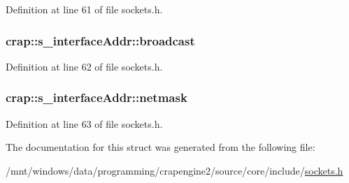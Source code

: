 Definition at line 61 of file sockets.\+h.

\hypertarget{structcrap_1_1s__interface_addr_a7071092e57a7629be2fc579d15ee8d0b}{}
\subsubsection[{broadcast}]{ crap\+::s\+\_\+interface\+Addr\+::broadcast}\label{structcrap_1_1s__interface_addr_a7071092e57a7629be2fc579d15ee8d0b}


Definition at line 62 of file sockets.\+h.

\hypertarget{structcrap_1_1s__interface_addr_a2854500a375e79a86faf2230ba6b9a93}{}
\subsubsection[{netmask}]{ crap\+::s\+\_\+interface\+Addr\+::netmask}\label{structcrap_1_1s__interface_addr_a2854500a375e79a86faf2230ba6b9a93}


Definition at line 63 of file sockets.\+h.



The documentation for this struct was generated from the following file\+:\begin{DoxyCompactItemize}
\item 
/mnt/windows/data/programming/crapengine2/source/core/include/\hyperlink{sockets_8h}{sockets.\+h}\end{DoxyCompactItemize}
